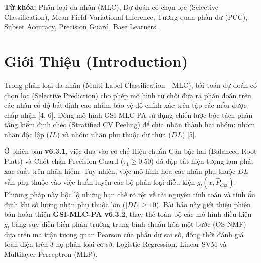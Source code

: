 \documentclass[10pt,a4paper,twoside]{article}
\begin{document}
\vspace{0.5em}
\noindent\textbf{Từ khóa:} Phân loại đa nhãn (MLC), Dự đoán có chọn lọc (Selective Classification), Mean-Field Variational Inference, Tương quan phần dư (PCC), Subset Accuracy, Precision Guard, Base Learners.

\section{Giới Thiệu (Introduction)}
Trong phân loại đa nhãn (Multi-Label Classification - MLC), bài toán dự đoán có chọn lọc (Selective Prediction) cho phép mô hình từ chối đưa ra phán đoán trên các nhãn có độ bất định cao nhằm bảo vệ độ chính xác trên tập các mẫu được chấp nhận [4, 6]. Dòng mô hình GSI-MLC-PA sử dụng chiến lược bóc tách phân tầng kiểm định chéo (Stratified CV Peeling) để chia nhãn thành hai nhóm: nhóm nhãn độc lập ($IL$) và nhóm nhãn phụ thuộc dư thừa ($DL$) [5].

Ở phiên bản \textbf{v6.3.1}, việc đưa vào cơ chế Hiệu chuẩn Căn bậc hai (Balanced-Root Platt) và Chốt chặn Precision Guard ($\tau_1 \ge 0.50$) đã dập tắt hiện tượng lạm phát xác suất trên nhãn hiếm. Tuy nhiên, việc mô hình hóa các nhãn phụ thuộc $DL$ vẫn phụ thuộc vào việc huấn luyện các bộ phân loại điều kiện $g_l(x, \hat{P}_{\text{cha}})$. Phương pháp này bộc lộ những hạn chế rõ rệt về tài nguyên tính toán và tính ổn định khi số lượng nhãn phụ thuộc lớn ($|DL| \ge 10$). Bài báo này giới thiệu phiên bản hoàn thiện \textbf{GSI-MLC-PA v6.3.2}, thay thế toàn bộ các mô hình điều kiện $g_l$ bằng suy diễn biến phân trường trung bình chuẩn hóa một bước (OS-NMF) dựa trên ma trận tương quan Pearson của phần dư sai số, đồng thời đánh giá toàn diện trên 3 họ phân loại cơ sở: Logistic Regression, Linear SVM và Multilayer Perceptron (MLP).
\end{document}
